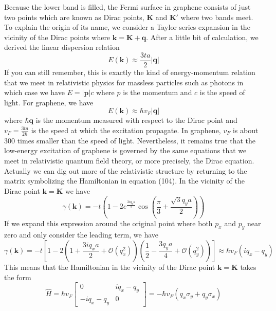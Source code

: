 \documentclass{article}
\begin{document}
Because the lower band is filled, the Fermi surface in graphene consists of just two points which are known as Dirac points, $\mathbf{K}$ and $\mathbf{K}'$ where two bands meet. To explain the origin of its name, we consider a Taylor series expansion in the vicinity of the Dirac points where $\mathbf{k}=\mathbf{K}+\mathbf{q}$. After a little bit of calculation, we derived the linear dispersion relation\begin{equation}
    E(\mathbf{k})\approx\frac{3ta}{2}|\mathbf{q}|
\end{equation}
If you can still remember, this is exactly the kind of energy-momentum relation that we meet in relativistic physics for massless particles such as photons in which case we have $E=|\mathbf{p}|c$ where $p$ is the momentum and $c$ is the speed of light. For graphene, we have\begin{equation}
    E(\mathbf{k})\approx\hbar{v}_F|\mathbf{q}|
\end{equation}
where $\hbar\mathbf{q}$ is the momentum measured with respect to the Dirac point and $v_F=\frac{3ta}{2\hbar}$ is the speed at which the excitation propagate. In graphene, $v_F$ is about 300 times smaller than the speed of light. Nevertheless, it remains true that the low-energy excitation of graphene is governed by the same equations that we meet in relativistic quantum field theory, or more precisely, the Dirac equation. Actually we can dig out more of the relativistic structure by returning to the matrix symbolizing the Hamiltonian in equation (104). In the vicinity of the Dirac point $\mathbf{k}=\mathbf{K}$ we have\begin{equation}
    \gamma(\mathbf{k})=-t(1-2e^{\frac{3iq_xa}{2}}\cos(\frac{\pi}{3}+\frac{\sqrt3q_ya}{2}))
\end{equation}
If we expand this expression around the original point where both $p_x$ and $p_y$ near zero and only consider the leading term, we have\begin{equation}
    \gamma(\mathbf{k})=-t[1-2(1+\frac{3iq_xa}{2}+\mathcal{O}(q_x^2))(\frac12-\frac{3q_ya}{4}+\mathcal{O}(q_y^2))]\approx\hbar{v}_F(iq_x-q_y)
\end{equation}
This means that the Hamiltonian in the vicinity of the Dirac point $\mathbf{k}=\mathbf{K}$ takes the form\begin{equation}
    \hat{H}=\hbar{v}_F\begin{bmatrix}
    0 & iq_x-q_y\\
    -iq_x-q_y & 0
    \end{bmatrix}=-\hbar{v}_F(q_x\sigma_y+q_y\sigma_x)
\end{equation}
\end{document}
